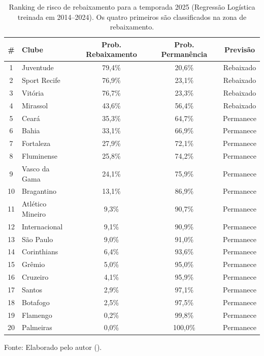 \begin{table}[htbp]
    \centering
    \caption[Ranking de risco previsto para 2025]{Ranking de risco de rebaixamento para a temporada 2025 (Regressão Logística treinada em 2014--2024). Os quatro primeiros são classificados na zona de rebaixamento.}
    \label{tab:previsao2025}
    \small
    \begin{tabular}{clccc}
        \toprule
        \textbf{\#} & \textbf{Clube} & \textbf{Prob. Rebaixamento} & \textbf{Prob. Permanência} & \textbf{Previsão} \\
        \midrule
        1  & Juventude        & 79,4\% & 20,6\%  & Rebaixado \\
        2  & Sport Recife     & 76,9\% & 23,1\%  & Rebaixado \\
        3  & Vitória          & 76,7\% & 23,3\%  & Rebaixado \\
        4  & Mirassol         & 43,6\% & 56,4\%  & Rebaixado \\
        \midrule
        5  & Ceará            & 35,3\% & 64,7\%  & Permanece \\
        6  & Bahia            & 33,1\% & 66,9\%  & Permanece \\
        7  & Fortaleza        & 27,9\% & 72,1\%  & Permanece \\
        8  & Fluminense       & 25,8\% & 74,2\%  & Permanece \\
        9  & Vasco da Gama    & 24,1\% & 75,9\%  & Permanece \\
        10 & Bragantino       & 13,1\% & 86,9\%  & Permanece \\
        11 & Atlético Mineiro & 9,3\%  & 90,7\%  & Permanece \\
        12 & Internacional    & 9,1\%  & 90,9\%  & Permanece \\
        13 & São Paulo        & 9,0\%  & 91,0\%  & Permanece \\
        14 & Corinthians      & 6,4\%  & 93,6\%  & Permanece \\
        15 & Grêmio           & 5,0\%  & 95,0\%  & Permanece \\
        16 & Cruzeiro         & 4,1\%  & 95,9\%  & Permanece \\
        17 & Santos           & 2,9\%  & 97,1\%  & Permanece \\
        18 & Botafogo         & 2,5\%  & 97,5\%  & Permanece \\
        19 & Flamengo         & 0,2\%  & 99,8\%  & Permanece \\
        20 & Palmeiras        & 0,0\%  & 100,0\% & Permanece \\
        \bottomrule
    \end{tabular}

    \vspace{2pt}
    {\small Fonte: Elaborado pelo autor (\the\year).}
\end{table}

